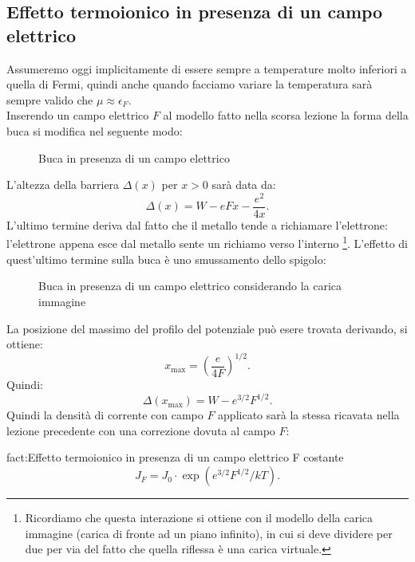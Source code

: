 \subsection{Effetto termoionico in presenza di un campo elettrico}%
Assumeremo oggi implicitamente di essere sempre a temperature molto inferiori a quella di Fermi, quindi anche quando facciamo variare la temperatura sarà sempre valido che $\mu \approx \epsilon _{F}$. \\
Inserendo un campo elettrico $F$ al modello fatto nella scorsa lezione la forma della buca si modifica nel seguente modo:
\begin{figure}[H]
    \centering
    \caption{\scriptsize Buca in presenza di un campo elettrico}
    \label{fig:buca-in-presenza-di-un-campo-elettrico}
\end{figure}
\noindent
L'altezza della barriera $\Delta ( x) $ per $x > 0$ sarà data da:
\[
	\Delta ( x) = W - eFx - \frac{e^2}{4x}
.\] 
L'ultimo termine deriva dal fatto che il metallo tende a richiamare l'elettrone: l'elettrone appena esce dal metallo sente un richiamo verso l'interno \footnote{Ricordiamo che questa interazione si ottiene con il modello della carica immagine (carica di fronte ad un piano infinito), in cui si deve dividere per due per via del fatto che quella riflessa è una carica virtuale.}. L'effetto di quest'ultimo termine sulla buca è uno smussamento dello spigolo:
\begin{figure}[H]
    \centering
    \caption{\scriptsize Buca in presenza di un campo elettrico considerando la carica immagine}
    \label{fig:buca-in-presenza-di-un-campo-elettrico-considerando-la-carica-immagine}
\end{figure}
La posizione del massimo del profilo del potenziale può esere trovata derivando, si ottiene:
\[
	x_{\text{max}}= \left( \frac{e}{4F} \right) ^{1 /2}
.\] 
Quindi:
\[
	\Delta ( x_{\text{max}}) = W - e^{3 /2}F^{1 /2}
.\] Quindi la densità di corrente con campo $F$ applicato sarà la stessa ricavata nella lezione precedente con una correzione dovuta al campo $F$:
\begin{fact}{fact:Effetto termoionico in presenza di un campo elettrico F costante}
\[
	J_{F}= J_0\cdot \exp\left( e^{3 /2}F^{1 /2} /kT \right) 
.\] 
\end{fact}
